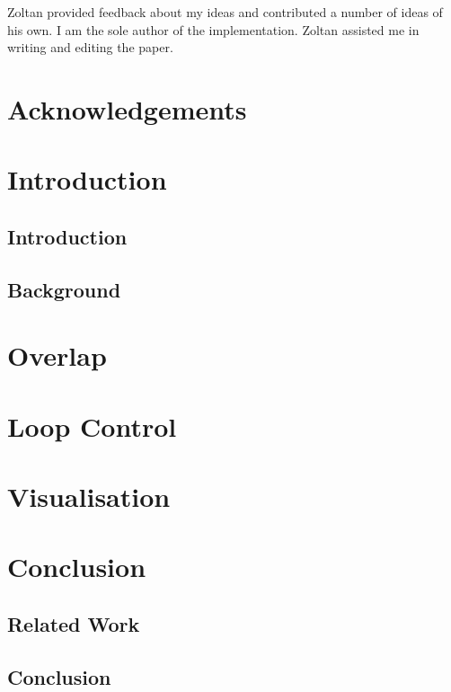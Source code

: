 \documentclass[a4paper,twoside]{report}
\begin{document}
Zoltan provided feedback about my ideas and contributed a number of ideas of
his own.
I am the sole author of the implementation.
Zoltan assisted me in writing and editing the paper.

\chapter*{Acknowledgements}

\tableofcontents

\listoffigures

\listoftables

\chapter{Introduction}

\section{Introduction}

\section{Background}

\chapter{Overlap}
\label{ref:overlap}


\chapter{Loop Control}
\label{ref:loop_control}


\chapter{Visualisation}
\label{ref:tscope}


\chapter{Conclusion}

\section{Related Work}

\section{Conclusion}



\end{document}
